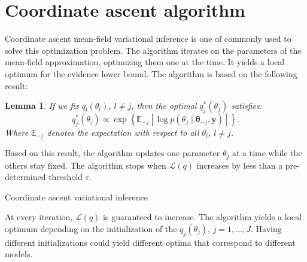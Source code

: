 \documentclass[a4paper, 11pt]{report}
\numberwithin{equation}{chapter}
\newtheorem{lemma}{Lemma}[chapter]
\begin{document}
\section{Coordinate ascent algorithm}
Coordinate ascent mean-field variational inference  is one of commonly used to solve this optimization problem. The algorithm iterates on the parameters of the mean-field approximation, optimizing them one at the time. It yields a local optimum for the evidence lower bound. The algorithm is based on the following result:
\begin{lemma}

If we fix $q_l(\theta_l)$, $l\neq j$, then the optimal $q^*_j(\theta_j)$ satisfies:
\begin{equation*}
q^*_j(\theta_j) \propto \exp\left\lbrace\mathbb{E}_{-j}\left[\log p(\theta_j \mid \boldsymbol{\theta}_{-j}, \boldsymbol{y})\right]\right\rbrace.
\end{equation*}
Where $\mathbb{E}_{-j}$ denotes the expectation with respect to all $\theta_l$, $l \neq j$.
\end{lemma}

Based on this result, the algorithm updates one parameter $\theta_j$ at a time while the others stay fixed. The algorithm stops when $\mathcal{L}(q)$ increases by less than a pre-determined threshold $\varepsilon$.

\begin{algorithm}
\BlankLine
{}
\BlankLine
{}
\BlankLine
{}
\caption{\label{alg:CAVI}Coordinate ascent variational inference}
\end{algorithm}
At every iteration, $\mathcal{L}(q)$ is guaranteed to increase. The algorithm yields a local optimum depending on the initialization of the $q_j(\theta_j)$, $j=1,\ldots,J$. Having different initializations could yield different optima that correspond to different models.
\end{document}
